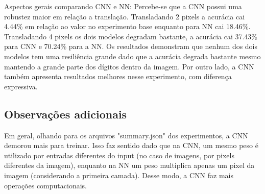 \documentclass[11pt,a4paper]{article}
\begin{document}
Aspectos gerais comparando CNN e NN: Percebe-se que a CNN possui uma robustez maior em relação a translação. Transladando 2 pixels a acurácia cai 4.44\% em relação ao valor no experimento base enquanto para NN cai 18.46\%. Transladando 4 pixels os dois modelos degradam bastante, a acurácia cai 37.43\% para CNN e 70.24\% para a NN. Os resultados demonstram que nenhum dos dois modelos tem uma resiliência grande dado que a acurácia degrada bastante mesmo mantendo a grande parte dos dígitos dentro da imagem. Por outro lado, a CNN também apresenta resultados melhores nesse experimento, com diferença expressiva.

\subsection{Observações adicionais}
Em geral, olhando para os arquivos "summary.json" dos experimentos, a CNN demorou mais para treinar. Isso faz sentido dado que na CNN, um mesmo peso é utilizado por entradas diferentes do input (no caso de imagens, por pixels diferentes da imagem), enquanto na NN um peso multiplica apenas um pixel da imagem (considerando a primeira camada). Desse modo, a CNN faz mais operações computacionais.
\end{document}
